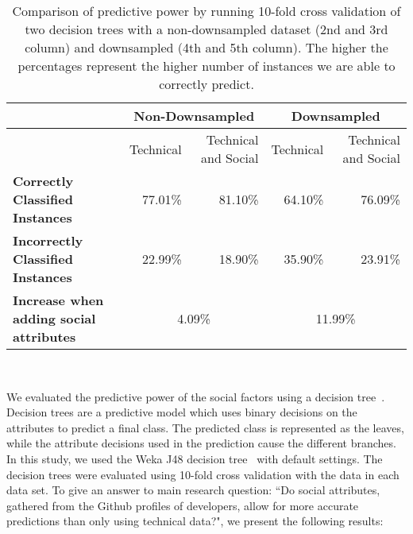 \documentclass[10pt, conference]{IEEEtran}
\begin{document}
\begin{table*}[ht]
\centering
\begin{tabular}{l||r|r||r|r}
  & \multicolumn{2}{|c||}{Non-Downsampled}  & \multicolumn{2}{|c}{Downsampled} \\
\hline
  & Technical & Technical and Social & Technical & Technical and Social \\
\hline
\textbf{Correctly Classified Instances}&  77.01\% & 81.10\%  & 64.10\% & 76.09\%\\

\textbf{Incorrectly Classified Instances}&  22.99\% & 18.90\% & 35.90\% & 23.91\%\\



\hline
\textbf{Increase when adding social attributes}& \multicolumn{2}{|c||}{4.09\%}  & \multicolumn{2}{|c}{11.99\%}\\

\hline
\end{tabular}
\\
\center
  \caption{Comparison of predictive power by running 10-fold
    cross validation of two decision trees with a non-downsampled dataset (2nd and 3rd column) and downsampled (4th and 5th column). The higher the percentages represent the higher number of instances we are able to correctly predict. \label{resultsTable}}   
\end{table*}

We evaluated the predictive power of the social factors using a decision
tree~\cite{Quinlan86}.
Decision trees are a predictive model which uses binary decisions on the
attributes to predict a final class.  The predicted class is represented as the
leaves, while the attribute decisions used in the prediction cause the
different branches.
In this study, we used the Weka J48 decision tree~\cite{Weka,Quinlan1993}
with default settings. The decision trees were evaluated using 10-fold cross 
validation with the data in each data set.
To give an answer to main research question: ``Do social attributes, gathered 
from the Github profiles of developers,
allow for more accurate predictions than only using technical data?", we 
present the following results:
\end{document}
